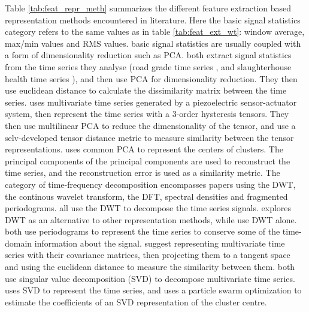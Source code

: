 Table \ref{tab:feat_repr_meth} summarizes the different feature extraction based representation methods encountered in literature. 
Here the basic signal statistics category refers to the same values as in table \ref{tab:feat_ext_wt}: window average, max/min values and RMS values.
basic signal statistics are usually coupled with a form of dimensionality reduction such as PCA. 
\textcite{tsc_slaughterhouse, road_grade_china_pca_kmeans} both extract signal statistics from the time series they analyse (road grade time series \cite{road_grade_china_pca_kmeans}, and slaughterhouse health time series \cite{tsc_slaughterhouse}),
and then use PCA for dimensionality reduction. They then use euclidean distance to calculate the dissimilarity matrix between the time series.
\textcite{hysteresis_tsc_tensor_decomp} uses multivariate time series generated by a piezoelectric sensor-actuator system, 
then represent the time series with a 3-order hysteresis tensors.
They then use multilinear PCA to reduce the dimensionality of the tensor, and use a selv-developed tensor distance metric to measure similarity between the tensor representations.
\textcite{multivariate_tsc_common_pca} uses common PCA to represent the centers of clusters.
The principal components of the principal components are used to reconstruct the time series, and the reconstruction error is used as a similarity metric.
The category of time-frequency decomposition encompasses papers using the DWT, the continous wavelet transform, the DFT, spectral densities and fragmented periodograms.
\textcite{shape_feat_mod_tsc_rfa, ambient_air_vape_k_means, dwt_hac_kmeans_som} all use the DWT to decompose the time series signals. 
\textcite{shape_feat_mod_tsc_rfa} explores DWT as an alternative to other representation methods, while \textcite{ambient_air_vape_k_means, dwt_hac_kmeans_som} use DWT alone.
\textcite{fragmented_periodogram, BSLEX_nonlin_nonstat_tsc} both use periodograms to represent the time series to conserve some of the time-domain information about the signal. 
\textcite{multivar_tsc_riemann_manifold} suggest representing multivariate time series with their covariance matrices, then projecting them to a tangent space and using the euclidean distance to measure the similarity between them.
\textcite{fuzzy_c_means_pso_svd, svd_birch_tsc_stock_price} both use singular value decomposition (SVD) to decompose multivariate time series. 
\textcite{fuzzy_c_means_pso_svd} uses SVD to represent the time series, and uses a particle swarm optimization to estimate the coefficients of an SVD representation of the cluster centre.
